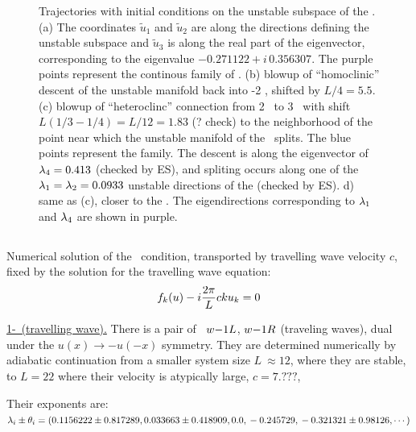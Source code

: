 \begin{figure}[h]
{ Trajectories with initial conditions on the unstable subspace of
 the  {\eqva}.  
 (a) The coordinates $\tilde{u}_1$ and $\tilde{u}_2$ are along the directions defining the unstable subspace
 and $\tilde{u}_3$  is along the real part of the eigenvector, 
 corresponding to the eigenvalue $-0.271122+ i\, 0.356307$. The purple points represent the continous family
 of 
 \eqva.
(b) blowup of ``homoclinic'' descent of the unstable manifold
back into {\nameit}-2 {\eqv}, shifted by
$L/4 =5.5$.
(c) blowup of ``heteroclinc'' connection from 
{\nameit}2 \eqv\ to {\nameit}3 \eqv\, with shift 
$L(1/3-1/4) = L/12 = 1.83$ (? check)
to the neighborhood of the point near which the
unstable manifold of the 
 \eqv\ splits. The blue points
represent the 
 {\eqv} family.
The descent is along the eigenvector of $\lambda_4= 0.413$ (checked by ES),
and spliting
occurs along one of the 
$\lambda_1=\lambda_2=0.0933$
unstable directions of the  {\eqv} (checked by ES).
d) same as (c), closer to the  {\eqv}. The eigendirections corresponding to $\lambda_1$
and $\lambda_4$ are shown in purple. 
}
\label{f:neighborhood2w}
\end{figure}


\subsection{\Reqva}

Numerical solution of the \reqv\  condition,
transported by travelling wave velocity $c$, 
fixed by the solution for the travelling wave equation:
\[
f_k(u) - i{2\pi\over L} c k u_k = 0
\]

\underline{1-\reqv\  (travelling wave).}
There is a pair of \reqva\ 
${w-}1L$,
${w-}1R$
(traveling waves), dual under the
$u(x) \to -u(-x)$ symmetry. They are 
determined numerically by 
adiabatic continuation from a smaller system size
$L~\approx 12$,
where they are stable, to $L=22$
where their velocity is atypically large, $c=7.???$,

Their exponents are:
\\
$\lambda_i \pm \theta_i =
(
\\
  0.1156222 \pm 0.817289,	\\
  0.033663 \pm 0.418909,	\\
 0.0                    ,	\\
 -0.245729                    ,	\\
 -0.321321 \pm 0.98126,
\cdots
)$

